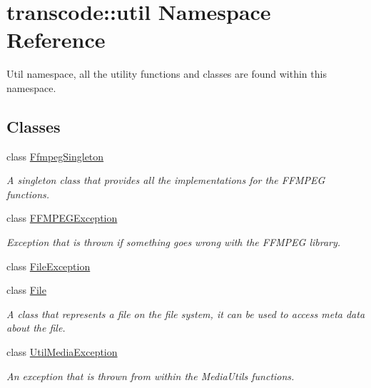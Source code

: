 \hypertarget{namespacetranscode_1_1util}{
\section{transcode::util Namespace Reference}
\label{namespacetranscode_1_1util}
}


Util namespace, all the utility functions and classes are found within this namespace.  


\subsection*{Classes}
\begin{DoxyCompactItemize}
\item 
class \hyperlink{classtranscode_1_1util_1_1FfmpegSingleton}{FfmpegSingleton}
\begin{DoxyCompactList}\small\item\em A singleton class that provides all the implementations for the FFMPEG functions. \item\end{DoxyCompactList}\item 
class \hyperlink{classtranscode_1_1util_1_1FFMPEGException}{FFMPEGException}
\begin{DoxyCompactList}\small\item\em Exception that is thrown if something goes wrong with the FFMPEG library. \item\end{DoxyCompactList}\item 
class \hyperlink{classtranscode_1_1util_1_1FileException}{FileException}
\item 
class \hyperlink{classtranscode_1_1util_1_1File}{File}
\begin{DoxyCompactList}\small\item\em A class that represents a file on the file system, it can be used to access meta data about the file. \item\end{DoxyCompactList}\item 
class \hyperlink{classtranscode_1_1util_1_1UtilMediaException}{UtilMediaException}
\begin{DoxyCompactList}\small\item\em An exception that is thrown from within the MediaUtils functions. \item\end{DoxyCompactList}\end{DoxyCompactItemize}
